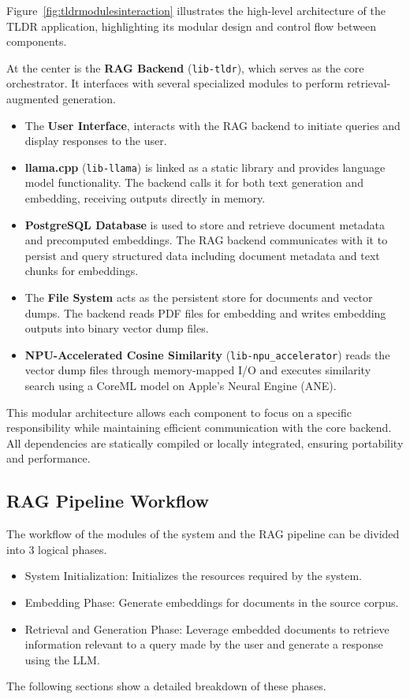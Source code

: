 Figure~\ref{fig:tldrmodulesinteraction} illustrates the high-level architecture of the TLDR application, highlighting its modular design and control flow between components.

At the center is the \textbf{RAG Backend} (\texttt{lib-tldr}), which serves as the core orchestrator. It interfaces with several specialized modules to perform retrieval-augmented generation.

\begin{itemize}
    \item The \textbf{User Interface}, interacts with the RAG backend to initiate queries and display responses to the user.
    
    \item \textbf{llama.cpp} (\texttt{lib-llama}) is linked as a static library and provides language model functionality. The backend calls it for both text generation and embedding, receiving outputs directly in memory.
    
    \item \textbf{PostgreSQL Database} is used to store and retrieve document metadata and precomputed embeddings. The RAG backend communicates with it to persist and query structured data including document metadata and text chunks for embeddings.
    
    \item The \textbf{File System} acts as the persistent store for documents and vector dumps. The backend reads PDF files for embedding and writes embedding outputs into binary vector dump files.
    
    \item \textbf{NPU-Accelerated Cosine Similarity} (\texttt{lib-npu\_accelerator}) reads the vector dump files through memory-mapped I/O and executes similarity search using a CoreML model on Apple's Neural Engine (ANE).
\end{itemize}

This modular architecture allows each component to focus on a specific responsibility while maintaining efficient communication with the core backend. All dependencies are statically compiled or locally integrated, ensuring portability and performance.


\subsection{RAG Pipeline Workflow}
\label{subsec:RAGWorkflow}
The workflow of the modules of the system and the RAG pipeline can be divided into 3 logical phases. 
\begin{itemize}
    \item System Initialization: Initializes the resources required by the system.
    \item Embedding Phase: Generate embeddings for documents in the source corpus.
    \item Retrieval and Generation Phase: Leverage embedded documents to retrieve information relevant to a query made by the user and generate a response using the LLM.
\end{itemize}
The following sections show a detailed breakdown of these phases.

